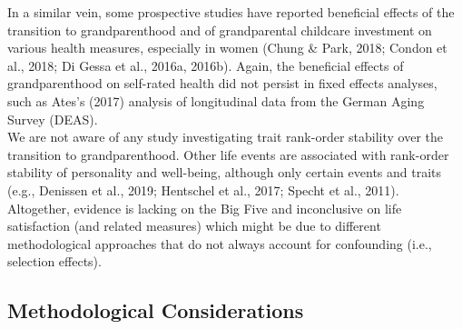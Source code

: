\documentclass[
  english,
  man, noextraspace,floatsintext]{apa7}
\begin{document}
In a similar vein, some prospective studies have reported beneficial effects of the transition to grandparenthood and of grandparental childcare investment on various health measures, especially in women (Chung \& Park, 2018; Condon et al., 2018; Di Gessa et al., 2016a, 2016b). Again, the beneficial effects of grandparenthood on self-rated health did not persist in fixed effects analyses, such as Ates's (2017) analysis of longitudinal data from the German Aging Survey (DEAS).\\
We are not aware of any study investigating trait rank-order stability over the transition to grandparenthood. Other life events are associated with rank-order stability of personality and well-being, although only certain events and traits (e.g., Denissen et al., 2019; Hentschel et al., 2017; Specht et al., 2011). Altogether, evidence is lacking on the Big Five and inconclusive on life satisfaction (and related measures) which might be due to different methodological approaches that do not always account for confounding (i.e., selection effects).

\hypertarget{methodological-considerations}{%
\subsection{Methodological Considerations}\label{methodological-considerations}}
\end{document}
